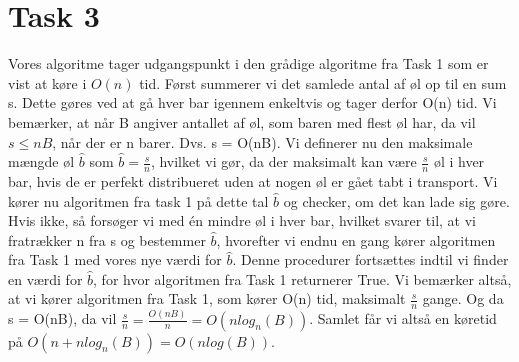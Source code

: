 \section{Task 3}
Vores algoritme tager udgangspunkt i den grådige algoritme fra Task 1 som er vist at køre i $O(n)$ tid.
Først summerer vi det samlede antal af øl op til en sum s. Dette gøres ved at gå hver bar igennem enkeltvis og tager derfor O(n) tid.
Vi bemærker, at når B angiver antallet af øl, som baren med flest øl har, da vil $s \leq nB$, når der er n barer.
Dvs. s = O(nB).
Vi definerer nu den maksimale mængde øl $\hat{b}$ som $\hat{b} = \frac{s}{n}$, hvilket vi gør, da der maksimalt kan være $\frac{s}{n}$ øl i hver bar, hvis de er perfekt distribueret uden at nogen øl er gået tabt i transport. Vi kører nu algoritmen fra task 1 på dette tal $\hat{b}$ og checker, om det kan lade sig gøre. Hvis ikke, så forsøger vi med én mindre øl i hver bar, hvilket svarer til, at vi fratrækker n fra s og bestemmer $\hat{b}$, hvorefter vi endnu en gang kører algoritmen fra Task 1 med vores nye værdi for $\hat{b}$. Denne procedurer fortsættes indtil vi finder en værdi for $\hat{b}$, for hvor algoritmen fra Task 1 returnerer True.
Vi bemærker altså, at vi kører algoritmen fra Task 1, som kører O(n) tid, maksimalt $\frac{s}{n}$ gange. Og da s = O(nB), da vil $\frac{s}{n} = \frac{O(nB)}{n} = O(nlog_n(B))$.
Samlet får vi altså en køretid på $O(n + nlog_n(B)) = O(nlog(B))$.
